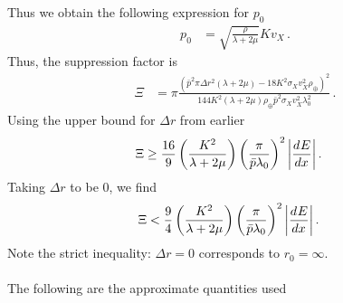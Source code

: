 \documentclass{article}
\newcommand*\p[1]{\left(#1\right)}
\newcommand*\f[2]{\frac{#1}{#2}}
\newcommand*\td[3]{\frac{d^{#3}#1}{d #2^{#3}}}
\begin{document}
Thus we obtain the following expression for $p_0$
\begin{align}
p_0&=\sqrt{\f{\rho}{\lambda+2\mu}}Kv_X\,.
\end{align}
Thus, the suppression factor is
\begin{align}
\Xi&=\pi \f{(\bar p^2\pi \Delta r^2(\lambda+2\mu)-18K^2\sigma_Xv_X^2\rho_{\oplus})^2}{144K^2(\lambda+2\mu)\rho_{\oplus}\bar p^2 \sigma_X v_X^2\lambda_0^2}\,.
\end{align}
Using the upper bound for $\Delta r$ from earlier
\begin{align}
\Xi&\geq\f{16}{9}\p{\f{K^2}{\lambda+2\mu}}\p{\f{\pi}{\bar p\lambda_0}}^2\abs{\td{E}{x}{}}\,.
\end{align}
Taking $\Delta r$ to be 0, we find
\begin{align}
\Xi&<\f{9}{4}\p{\f{K^2}{\lambda+2\mu}}\p{\f{\pi}{\bar p\lambda_0}}^2\abs{\td{E}{x}{}}\,.
\end{align}
Note the strict inequality: $\Delta r=0$ corresponds to $r_0=\infty$.
\\\\
The following are the approximate quantities used
\end{document}
